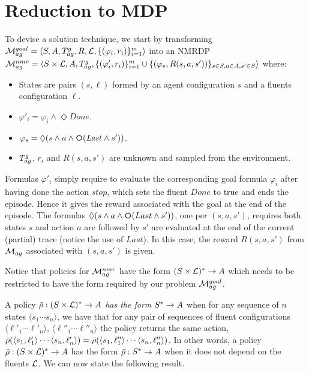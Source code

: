 \section{Reduction to MDP}\label{sect:rl-goals-reduction-to-mdp}
To devise a solution technique, we start by transforming
$\mathcal{M}_{ag}^{goal}= \langle S, A, T_{ag}^{g}, R, \mathcal{L},
\{(\varphi_i,r_i)\}_{i=1}^{m} \rangle$ into an NMRDP $\mathcal{M}_{ag}^{nmr} = \langle S\times \mathcal{L}, A, T_{ag}^{g}, \{(\varphi'_i,r_i)\}_{i=1}^{m} \cup \{(\varphi_s, R(s,a, s'))\}_{s\in S, a\in
	A, s'\in S} \rangle$ where:
\begin{itemize}
	\item States are pairs $(s,\ell)$  formed by an agent configuration $s$ and a fluents configuration $\ell$.
	\item $\varphi'_i = \varphi_i \land \Diamond Done$.
	\item $\varphi_s = \Diamond(s\land a\land \Next(\Last \land s'))$.
	\item $T_{ag}^{g}$, $r_i$ and  $R(s,a, s')$ are unknown and sampled from the environment.
\end{itemize} 

Formulas $\varphi'_i$ simply require to evaluate the corresponding
goal formula $\varphi_i$ after having done the action $stop$, which
sets the fluent $Done$ to true and ends the episode. Hence it gives
the reward associated with the goal at the end of the episode.
The formulas $\Diamond(s\land a\land \Next(Last \land s'))$, one per
$(s,a,s')$, requires both states $s$ and action $a$ are followed by
$s'$ are evaluated at the end of the current (partial) trace (notice
the use of $Last$).  In this case, the reward $R(s,a,s')$ from
$\mathcal{M}_{ag}$ associated with $ (s,a,s')$ is given.  


Notice that policies for $\mathcal{M}_{ag}^{nmr}$ have the form
$(S\times\mathcal{L})^*\rightarrow A$ which needs to be restricted to have the form required by our problem
$\mathcal{M}_{ag}^{goal}$.



A policy $\bar{\rho}:(S\times\mathcal{L})^*\rightarrow A$ \emph{has the form} $S^*\rightarrow A$
when for any sequence of $n$ states
$\langle s_1 \cdots s_n\rangle$,
we have that 
for any pair of sequences of fluent configurations 
$\langle \ell'_1 \cdots \ell'_n\rangle$, 
$\langle \ell''_1 \cdots \ell''_n\rangle$
the policy returns the same action, 
$\bar{\rho}(\langle s_1,\ell'_1\rangle \cdots \langle s_n,\ell'_n\rangle) = \bar{\rho}(\langle s_1,\ell''_1\rangle \cdots \langle s_n,\ell''_n\rangle)$.
In other words, a policy  $\bar{\rho}:(S\times\mathcal{L})^*\rightarrow A$ has the form $\bar{\rho}:S^*\rightarrow A$ when it does not depend on the fluents $\mathcal{L}$. 
We can now state the following result.


